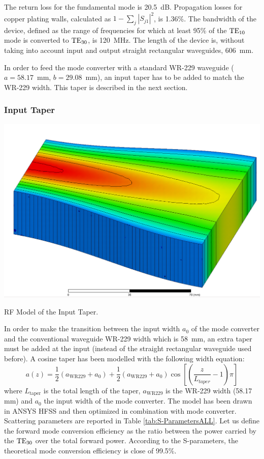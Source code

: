 The return loss for the fundamental mode is 20.5~dB. Propagation losses for copper plating walls, calculated as $1-\sum_{j}\left|S_{j1}\right|^{2}$, is 1.36\%. The bandwidth of the device, defined as the range of frequencies for which at least 95\% of the ${\mathrm{TE}}_{10}$ mode is converted to ${\mathrm{TE}}_{30}$, is 120~MHz.
The length of the device is, without taking into account input and output straight rectangular waveguides, 606~mm.


In order to feed the mode converter with a standard WR-229 waveguide ($a=58.17$~mm, $b=29.08$~mm), 
an input taper has to be added to match the WR-229 width. This taper is described in the next section.

\subsubsection{Input Taper}
\begin{marginfigure}
	\includegraphics[width=1.0\textwidth]{figures/chap3/ITER_modeconverter/HFSS_ModeConverterTaper}
	\caption{RF Model of the Input Taper. }
	\label{fig:taper}
\end{marginfigure}
In order to make the transition between the input width $a_{0}$ of the mode converter and the conventional waveguide WR-229 width which is 58~mm, an extra taper must be added at the input (instead of the straight rectangular waveguide used before). A cosine taper has been modelled with the following width equation:
\begin{equation}
a(z)=\frac{1}{2} 
\left(a_{\mbox{WR229}}+a_{0}\right)
+\frac{1}{2}\left(a_{\mbox{WR229}}+a_{0}\right)
\cos\left[\left(\frac{z}{L_{taper}}-1\right)\pi\right]
\end{equation}
where $L_{\mbox{taper}}$ is the total length of the taper, $a_{\mbox{WR229}}$ is the WR-229 width (58.17\,mm) and $a_{0}$ the input width of the mode converter. The model has been drawn in ANSYS HFSS and then optimized in combination with mode converter. Scattering parameters are reported in Table \ref{tab:S-ParametersALL}. Let us define the forward mode conversion efficiency as the ratio between the power carried by the ${\mathrm{TE}}_{30}$ over the total forward power. According to the S-parameters, the theoretical mode conversion efficiency is close of 99.5\%. 

